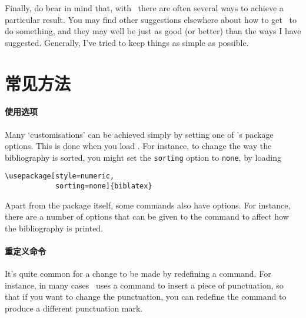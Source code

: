 Finally, do bear in mind that, with \biblatex\ there are often several
ways to achieve a particular result. You may find other suggestions
elsewhere about how to get \biblatex\ to do something, and they may
well be just as good (or better) than the ways I have
suggested. Generally, I've tried to keep things as simple as possible.

\clearpage
\section{常见方法}

\paragraph{使用选项}
Many `customisations' can be achieved simply by setting one of
\biblatex's package options. This is done when you load \biblatex. For
instance, to change the way the bibliography is sorted, you might set
the \verb|sorting| option to \verb|none|, by loading
\begin{verbatim}
\usepackage[style=numeric,
            sorting=none]{biblatex}
\end{verbatim}

Apart from the package itself, some commands also have options. For
instance, there are a number of options that can be given to the
command to affect how the bibliography is printed.

\paragraph{重定义命令} It's quite common for a change to be
made by redefining a command. For instance, in many cases \biblatex\
uses a command to insert a piece of punctuation, so that if you want
to change the punctuation,\intref{See p~\pageref{sec:punctuation}}
you can redefine the command to produce a different punctuation mark.

